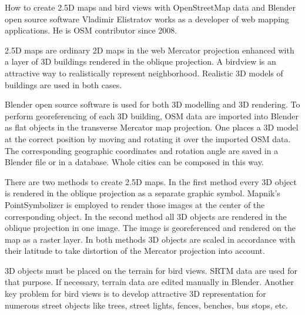 %
{How to create 2.5D maps and bird views with OpenStreetMap data and Blender open source software}%
{Vladimir Elistratov works as a developer of web mapping applications. He is OSM contributor since 2008. }%
{2.5D maps are ordinary 2D maps in the web Mercator projection enhanced with a layer of 3D buildings rendered in the oblique projection. A birdview is an attractive way to realistically represent neighborhood. Realistic 3D models of buildings are used in both cases.

Blender open source software is used for both 3D modelling and 3D rendering. To perform georeferencing of each 3D building, OSM data are imported into Blender as flat objects in the transverse Mercator map projection. One places a 3D model at the correct position by moving and rotating it over the imported OSM data. The corresponding geographic coordinates and rotation angle are saved in a Blender file or in a database. Whole cities can be composed in this way.

There are two methods to create 2.5D maps. In the first method every 3D object is rendered in the oblique projection as a separate graphic symbol. Mapnik's PointSymbolizer is employed to render those images at the center of the corresponding object. In the second method all 3D objects are rendered in the oblique projection in one image. The image is georeferenced and rendered on the map as a raster layer. In both methods 3D objects are scaled in accordance with their latitude to take distortion of the Mercator projection into account.

3D objects must be placed on the terrain for bird views. SRTM data are used for that purpose. If necessary, terrain data are edited manually in Blender. Another key problem for bird views is to develop attractive 3D representation for numerous street objects like trees, street lights, fences, benches, bus stops, etc.}

